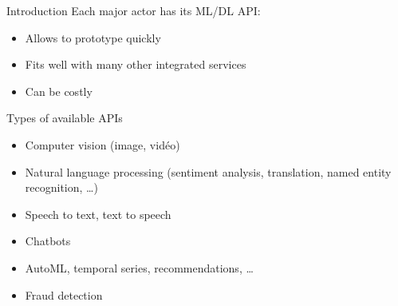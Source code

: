 \begin{frame}{Introduction}
  Each major actor has its ML/DL API:

  \begin{itemize}[<+->]
    \item Allows to prototype quickly
    \item Fits well with many other integrated services
    \item Can be costly
  \end{itemize}
\end{frame}

\begin{frame}{Types of available APIs}
  \begin{itemize}[<+->]
    \item Computer vision (image, vidéo)
    \item Natural language processing (sentiment analysis, translation, named entity recognition, …)
    \item Speech to text, text to speech
    \item Chatbots
    \item AutoML, temporal series, recommendations, …
    \item Fraud detection
  \end{itemize}
\end{frame}
